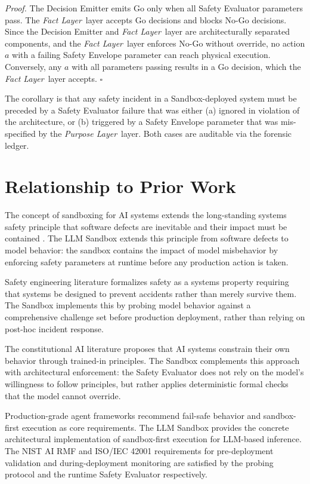 \documentclass[12pt]{article}
\newcommand{\purpose}{\textit{Purpose Layer}}
\newcommand{\fact}{\textit{Fact Layer}}
\begin{document}
\textit{Proof.} The Decision Emitter emits Go only when all Safety Evaluator parameters pass. The \fact\ layer accepts Go decisions and blocks No-Go decisions. Since the Decision Emitter and \fact\ layer are architecturally separated components, and the \fact\ layer enforces No-Go without override, no action $a$ with a failing Safety Envelope parameter can reach physical execution. Conversely, any $a$ with all parameters passing results in a Go decision, which the \fact\ layer accepts. $\square$

The corollary is that any safety incident in a Sandbox-deployed system must be preceded by a Safety Evaluator failure that was either (a) ignored in violation of the architecture, or (b) triggered by a Safety Envelope parameter that was mis-specified by the \purpose\ layer. Both cases are auditable via the forensic ledger.

\section{Relationship to Prior Work}
\label{sec:prior}

The concept of sandboxing for AI systems extends the long-standing systems safety principle that software defects are inevitable and their impact must be contained \cite{brooks1987}. The LLM Sandbox extends this principle from software defects to model behavior: the sandbox contains the impact of model misbehavior by enforcing safety parameters at runtime before any production action is taken.

Safety engineering literature \cite{leveson2011} formalizes safety as a systems property requiring that systems be designed to prevent accidents rather than merely survive them. The Sandbox implements this by probing model behavior against a comprehensive challenge set before production deployment, rather than relying on post-hoc incident response.

The constitutional AI literature \cite{bai2022} proposes that AI systems constrain their own behavior through trained-in principles. The Sandbox complements this approach with architectural enforcement: the Safety Evaluator does not rely on the model's willingness to follow principles, but rather applies deterministic formal checks that the model cannot override.

Production-grade agent frameworks \cite{alenezi2026} recommend fail-safe behavior and sandbox-first execution as core requirements. The LLM Sandbox provides the concrete architectural implementation of sandbox-first execution for LLM-based inference. The NIST AI RMF \cite{nist2023} and ISO/IEC 42001 \cite{iso2023} requirements for pre-deployment validation and during-deployment monitoring are satisfied by the probing protocol and the runtime Safety Evaluator respectively.
\end{document}
